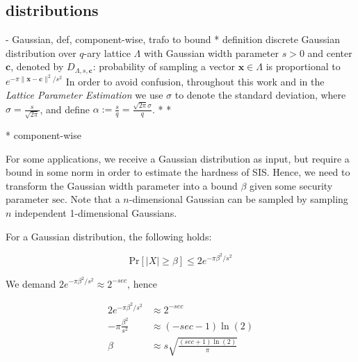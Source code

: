 \documentclass[
  a4paper,  %
  twoside,  %
  bibliography=totoc,
  headsepline,
  cleardoublepage=empty,
  parskip=half,
  draft=false
]{scrbook}
\begin{document}
\subsection{distributions}

  - Gaussian, def, component-wise, trafo to bound %
    * definition
      discrete Gaussian distribution over $q$-ary lattice $\Lambda$ with Gaussian width parameter $s > 0$ and center $\textbf{c}$, denoted by $D_{\Lambda, s, \textbf{c}}$: probability of sampling a vector $\textbf{x}\in \Lambda$ is proportional to $e^{-\pi \|\textbf{x} - \textbf{c}\|^2/s^2}$ %
      In order to avoid confusion, throughout this work and in the \textit{Lattice Parameter Estimation} we use $\sigma$ to denote the standard deviation, where $\sigma = \frac{s}{\sqrt{2 \pi}}$, and define $\alpha := \frac{s}{q} = \frac{\sqrt{2\pi} \sigma}{q}$. 
    * %
    * %

    * component-wise
    

    For some applications, we receive a Gaussian distribution as input, but require a bound in some norm in order to estimate the hardness of SIS. Hence, we need to transform the Gaussian width parameter into a bound $\beta$ given some security parameter $\text{sec}$. Note that a $n$-dimensional Gaussian can be sampled by sampling $n$ independent 1-dimensional Gaussians. %
        
    For a Gaussian distribution, the following holds: 
    
    \begin{equation}
      \text{Pr}\left[ |X| \geq \beta \right] \leq 2 e^{-\pi \beta^2/s^2}
    \end{equation}
    
    We demand $2 e^{-\pi \beta^2/s^2} \approx 2^{-sec}$, hence
    
    \begin{align*}
      2 e^{-\pi \beta^2/s^2} &\approx 2^{-sec}\\
      -\pi \frac{\beta^2}{s^2} &\approx (-sec - 1)\ln (2)\\
      \beta  &\approx s \sqrt{\frac{(sec + 1) \ln(2)}{\pi}}
    \end{align*}

    
    
\end{document}
